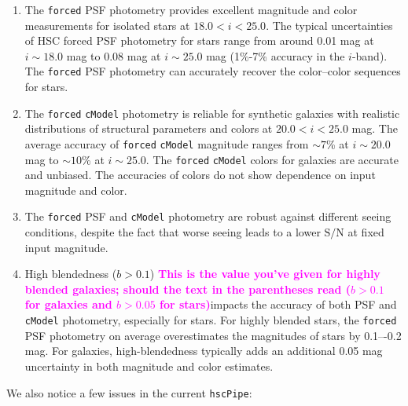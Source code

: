 \documentclass[useamsfonts]{pasj01}
\def\hscpipe{\texttt{hscPipe}}
\def\cmodel{\texttt{cModel}}
\def\forced{\texttt{forced}}
\newcommand{\susan}[1]{\textcolor{magenta} {\textbf{#1}}}
\begin{document}
    \begin{enumerate}

        \item The \forced{} PSF photometry provides excellent magnitude and color
            measurements for isolated stars at $18.0 < i < 25.0$.
            The typical uncertainties of HSC forced PSF photometry for stars range
            from around 0.01 mag at $i{\sim}18.0$ mag to 0.08 mag at $i{\sim}25.0$
            mag (1\%-7\% accuracy in the $i$-band).
            The \forced{} PSF photometry can accurately recover the color--color
            sequences for stars.

        \item The \forced{} \cmodel{} photometry is reliable for synthetic galaxies
            with realistic distributions of structural parameters and colors at
            $20.0 < i < 25.0$ mag.
            The average accuracy of \forced{} \cmodel{} magnitude ranges from
            ${\sim}7$\% at $i{\sim}20.0$ mag to ${\sim}10$\% at $i{\sim}25.0$.
            The \forced{} \cmodel{} colors for galaxies are accurate and unbiased.
            The accuracies of colors do not show dependence on input magnitude and
            color.

        \item The \forced{} PSF and \cmodel{} photometry are robust against different
            seeing conditions, despite the fact that worse seeing leads to a lower
            $\mathrm{S}/\mathrm{N}$ at fixed input magnitude.

        \item High blendedness ($b>0.1$) \susan{This is the value you've given for highly blended galaxies; should the text in the parentheses read ($b>0.1$ for galaxies and $b>0.05$ for stars)}impacts the accuracy of both PSF and \cmodel{}
            photometry, especially for stars.
            For highly blended stars, the \forced{} PSF photometry on average
            overestimates the magnitudes of stars by 0.1–-0.2 mag.
            For galaxies, high-blendedness typically adds an additional 0.05 mag
            uncertainty in both magnitude and color estimates.

    \end{enumerate}

    We also notice a few issues in the current \hscpipe{}:
\end{document}
